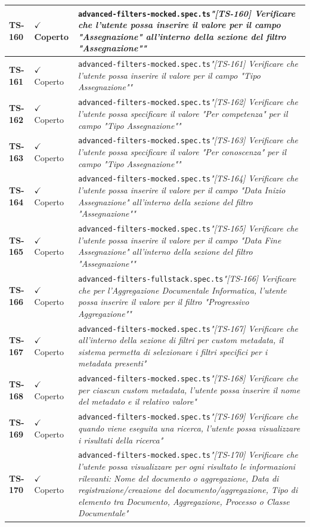 \documentclass[a4paper,12pt]{article}
\newcommand{\ok}{\textcolor{green!60!black}{$\checkmark$ Coperto}}
\newcommand{\f}[1]{\nolinkurl{#1}\newline}
\newcommand{\q}[1]{\textit{#1}}
\begin{document}
\begin{longtable}{|p{1.5cm}|p{3.0cm}|p{10.5cm}|}
\textbf{TS-160} & \ok & \f{advanced-filters-mocked.spec.ts}\q{"[TS-160] Verificare che l'utente possa inserire il valore per il campo "Assegnazione" all'interno della sezione del filtro "Assegnazione""} \\ \hline
\textbf{TS-161} & \ok & \f{advanced-filters-mocked.spec.ts}\q{"[TS-161] Verificare che l'utente possa inserire il valore per il campo "Tipo Assegnazione""} \\ \hline
\textbf{TS-162} & \ok & \f{advanced-filters-mocked.spec.ts}\q{"[TS-162] Verificare che l'utente possa specificare il valore "Per competenza" per il campo "Tipo Assegnazione""} \\ \hline
\textbf{TS-163} & \ok & \f{advanced-filters-mocked.spec.ts}\q{"[TS-163] Verificare che l'utente possa specificare il valore "Per conoscenza" per il campo "Tipo Assegnazione""} \\ \hline
\textbf{TS-164} & \ok & \f{advanced-filters-mocked.spec.ts}\q{"[TS-164] Verificare che l'utente possa inserire il valore per il campo "Data Inizio Assegnazione" all'interno della sezione del filtro "Assegnazione""} \\ \hline
\textbf{TS-165} & \ok & \f{advanced-filters-mocked.spec.ts}\q{"[TS-165] Verificare che l'utente possa inserire il valore per il campo "Data Fine Assegnazione" all'interno della sezione del filtro "Assegnazione""} \\ \hline
\textbf{TS-166} & \ok & \f{advanced-filters-fullstack.spec.ts}\q{"[TS-166] Verificare che per l'Aggregazione Documentale Informatica, l'utente possa inserire il valore per il filtro "Progressivo Aggregazione""} \\ \hline
\textbf{TS-167} & \ok & \f{advanced-filters-mocked.spec.ts}\q{"[TS-167] Verificare che all'interno della sezione di filtri per custom metadata, il sistema permetta di selezionare i filtri specifici per i metadata presenti"} \\ \hline
\textbf{TS-168} & \ok & \f{advanced-filters-mocked.spec.ts}\q{"[TS-168] Verificare che per ciascun custom metadata, l'utente possa inserire il nome del metadato e il relativo valore"} \\ \hline
\textbf{TS-169} & \ok & \f{advanced-filters-mocked.spec.ts}\q{"[TS-169] Verificare che quando viene eseguita una ricerca, l'utente possa visualizzare i risultati della ricerca"} \\ \hline
\textbf{TS-170} & \ok & \f{advanced-filters-mocked.spec.ts}\q{"[TS-170] Verificare che l'utente possa visualizzare per ogni risultato le informazioni rilevanti: Nome del documento o aggregazione, Data di registrazione/creazione del documento/aggregazione, Tipo di elemento tra Documento, Aggregazione, Processo o Classe Documentale"} \\ \hline

\end{longtable}
\end{document}
